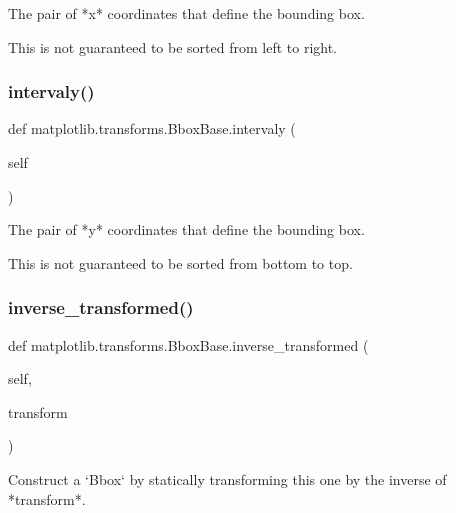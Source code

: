 \begin{DoxyVerb}The pair of *x* coordinates that define the bounding box.

This is not guaranteed to be sorted from left to right.
\end{DoxyVerb}
 \mbox{\label{classmatplotlib_1_1transforms_1_1BboxBase_a9d3fa6e44a8977f184703fc236c318e3}} 
\subsubsection{\texorpdfstring{intervaly()}{intervaly()}}
{\footnotesize\ttfamily def matplotlib.\+transforms.\+Bbox\+Base.\+intervaly (\begin{DoxyParamCaption}\item[{}]{self }\end{DoxyParamCaption})}

\begin{DoxyVerb}The pair of *y* coordinates that define the bounding box.

This is not guaranteed to be sorted from bottom to top.
\end{DoxyVerb}
 \mbox{\label{classmatplotlib_1_1transforms_1_1BboxBase_aa8e2023b9deac46c52efbbc21c50df63}} 
\subsubsection{\texorpdfstring{inverse\+\_\+transformed()}{inverse\_transformed()}}
{\footnotesize\ttfamily def matplotlib.\+transforms.\+Bbox\+Base.\+inverse\+\_\+transformed (\begin{DoxyParamCaption}\item[{}]{self,  }\item[{}]{transform }\end{DoxyParamCaption})}

\begin{DoxyVerb}Construct a `Bbox` by statically transforming this one by the inverse
of *transform*.
\end{DoxyVerb}
 \mbox{\label{classmatplotlib_1_1transforms_1_1BboxBase_a078e2ca26297c684aea783584f81a595}} 
